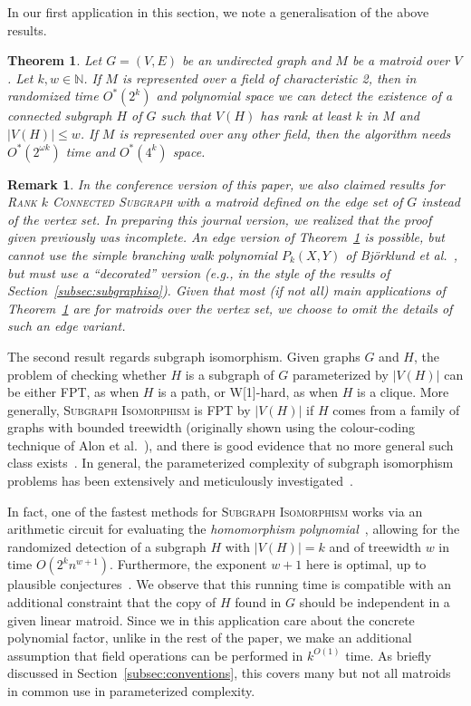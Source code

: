 \documentclass[10pt,a4paper]{article}
\newtheorem{theorem}{Theorem}[section]
\newtheorem{remark}{Remark}[section]
\newcommand{\N}{\ensuremath{\mathbb N}\xspace}
\begin{document}
In our first application in this section, we note a 
generalisation of the above results.

\begin{theorem}
  \label{thm:subtree-framework}
  Let $G=(V,E)$ be an undirected graph and $M$ be a matroid over $V$. 
  Let $k, w \in \N$. If $M$ is represented over a field of characteristic 2,
  then in randomized time $O^*(2^k)$ and polynomial space we can
  detect the existence of a connected subgraph $H$ of $G$ such that
  $V(H)$
  has rank at least $k$ in $M$ and
  $|V(H)| \leq w$.
  If $M$ is represented over any other field, then the algorithm needs
  $O^*(2^{\omega k})$ time and $O^*(4^k)$ space. 
\end{theorem}

\begin{remark}
  In the conference version of this paper, we also claimed results
  for \textsc{Rank $k$ Connected Subgraph} with a matroid defined on
  the edge set of $G$ instead of the vertex set. In preparing 
  this journal version, we realized that the proof given previously
  was incomplete. An edge version of Theorem~\ref{thm:subtree-framework} is possible,
  but cannot use the simple branching walk polynomial $P_k(X,Y)$
  of Björklund et al.~\cite{BjorklundKK16}, but must use a ``decorated'' version
  (e.g., in the style of the results of Section~\ref{subsec:subgraphiso}). 
  Given that most (if not all) main applications of Theorem~\ref{thm:subtree-framework}
  are for matroids over the vertex set, we choose to omit the details
  of such an edge variant.
\end{remark}

The second result regards subgraph isomorphism. Given graphs $G$ and $H$,
the problem of checking whether $H$ is a subgraph of $G$ parameterized
by $|V(H)|$ can be either FPT, as when $H$ is a path,
or W[1]-hard, as when $H$ is a clique. More generally,
\textsc{Subgraph Isomorphism} is FPT by $|V(H)|$ if $H$ comes from a
family of graphs with bounded treewidth (originally shown using the
colour-coding technique of Alon et al.~\cite{AlonYZ95}),
and there is good evidence that no more general such class
exists~\cite{BringmannS21,Marx10twd}.
In general, the parameterized complexity of subgraph isomorphism
problems has been extensively and meticulously investigated~\cite{JansenM15,MarxP14everything}.

In fact, one of the fastest methods for \textsc{Subgraph Isomorphism}
works via an arithmetic circuit for evaluating the \emph{homomorphism polynomial}~\cite{FominLRSR12},
allowing for the randomized detection of a subgraph $H$ with
$|V(H)|=k$ and of treewidth $w$ in time $O(2^kn^{w+1})$. 
Furthermore, the exponent $w+1$ here is optimal, up to plausible conjectures~\cite{BringmannS21}.
We observe that this running time is compatible with an additional constraint that 
the copy of $H$ found in $G$ should be independent in a given linear matroid.
Since we in this application care about the concrete polynomial factor,
unlike in the rest of the paper, we make an additional assumption that 
field operations can be performed in $k^{O(1)}$ time. As briefly discussed
in Section~\ref{subsec:conventions}, this covers many but not all matroids in common use
in parameterized complexity. 
\end{document}
